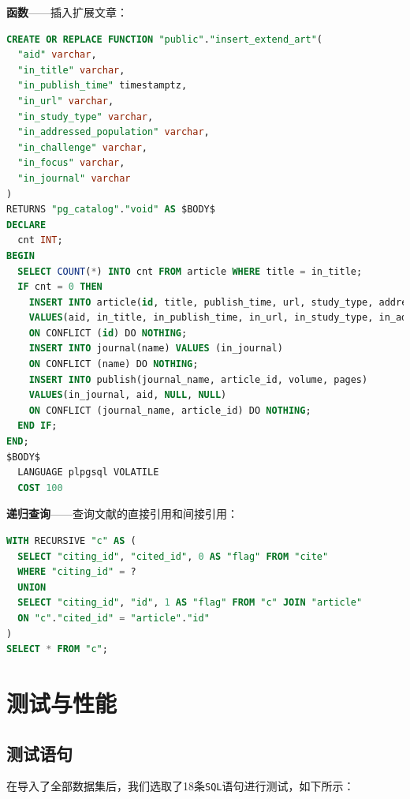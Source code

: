 \documentclass[UTF8,openany]{ctexbook}
\begin{document}
\textbf{函数}——插入扩展文章：

\begin{lstlisting}[language=sql]
CREATE OR REPLACE FUNCTION "public"."insert_extend_art"(
  "aid" varchar, 
  "in_title" varchar, 
  "in_publish_time" timestamptz, 
  "in_url" varchar, 
  "in_study_type" varchar, 
  "in_addressed_population" varchar, 
  "in_challenge" varchar, 
  "in_focus" varchar, 
  "in_journal" varchar
)
RETURNS "pg_catalog"."void" AS $BODY$
DECLARE
  cnt INT;
BEGIN
  SELECT COUNT(*) INTO cnt FROM article WHERE title = in_title;
  IF cnt = 0 THEN
    INSERT INTO article(id, title, publish_time, url, study_type, addressed_population, challenge, focus)
    VALUES(aid, in_title, in_publish_time, in_url, in_study_type, in_addressed_population, in_challenge, in_focus)
    ON CONFLICT (id) DO NOTHING;
    INSERT INTO journal(name) VALUES (in_journal)
    ON CONFLICT (name) DO NOTHING;
    INSERT INTO publish(journal_name, article_id, volume, pages)
    VALUES(in_journal, aid, NULL, NULL)
    ON CONFLICT (journal_name, article_id) DO NOTHING;
  END IF;
END;
$BODY$
  LANGUAGE plpgsql VOLATILE
  COST 100
\end{lstlisting}

\textbf{递归查询}——查询文献的直接引用和间接引用：

\begin{lstlisting}[language=sql]
WITH RECURSIVE "c" AS (
  SELECT "citing_id", "cited_id", 0 AS "flag" FROM "cite"
  WHERE "citing_id" = ?
  UNION
  SELECT "citing_id", "id", 1 AS "flag" FROM "c" JOIN "article"
  ON "c"."cited_id" = "article"."id"
) 
SELECT * FROM "c";
\end{lstlisting}

\chapter{测试与性能}
\label{sec:performance}

\section{测试语句}

在导入了全部数据集后，我们选取了18条\texttt{SQL}语句进行测试，如下所示：
\end{document}
